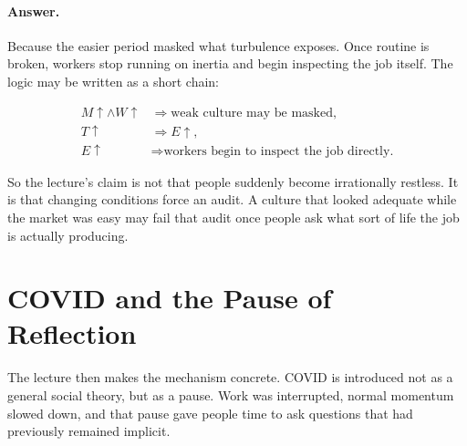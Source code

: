 \paragraph{Answer.} Because the easier period masked what turbulence exposes. Once routine is broken, workers stop running on inertia and begin inspecting the job itself. The logic may be written as a short chain:

\begin{align}
M \uparrow \land W \uparrow &\Rightarrow \text{weak culture may be masked},\\
T \uparrow &\Rightarrow E \uparrow,\\
E \uparrow &\Rightarrow \text{workers begin to inspect the job directly.}
\end{align}

So the lecture's claim is not that people suddenly become irrationally restless. It is that changing conditions force an audit. A culture that looked adequate while the market was easy may fail that audit once people ask what sort of life the job is actually producing.

\begin{figure}
\centering
{}
\end{figure}

\section{COVID and the Pause of Reflection}

The lecture then makes the mechanism concrete. COVID is introduced not as a general social theory, but as a pause. Work was interrupted, normal momentum slowed down, and that pause gave people time to ask questions that had previously remained implicit.

